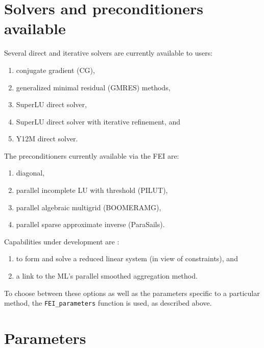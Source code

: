 \section{Solvers and preconditioners available}

Several direct and iterative solvers are
currently available to users:

\begin{enumerate}
\item conjugate gradient (CG), 
\item generalized minimal residual (GMRES) methods,
\item SuperLU direct solver,
\item SuperLU direct solver with iterative refinement, and
\item Y12M direct solver.
\end{enumerate}

The \hypre{} preconditioners currently available via the FEI are:

\begin{enumerate}
\item diagonal, 
\item parallel incomplete LU with threshold (PILUT),
\item parallel algebraic multigrid (BOOMERAMG),
\item parallel sparse approximate inverse (ParaSails).
\end{enumerate}

Capabilities under development are :
\begin{enumerate}
\item to form and solve a reduced linear system (in view of constraints), and
\item a link to the ML's parallel smoothed aggregation method.
\end{enumerate}

To choose between these options as well as the parameters specific to a
particular method, the {\tt FEI\_parameters} function is used, as described
above.

\section{Parameters}

